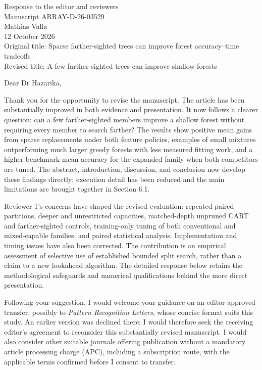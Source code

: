 \documentclass[11pt]{article}
\begin{document}
\begin{center}
{\Large Response to the editor and reviewers}\\[6pt]
Manuscript ARRAY-D-26-03529\\
Mathias Valla\\
12 October 2026\\
Original title: Sparse farther-sighted trees can improve forest accuracy--time tradeoffs\\
Revised title: A few farther-sighted trees can improve shallow forests
\end{center}

Dear Dr Hazarika,

Thank you for the opportunity to revise the manuscript. The article has been substantially improved in both evidence and presentation. It now follows a clearer question: can a few farther-sighted members improve a shallow forest without requiring every member to search farther? The results show positive mean gains from sparse replacements under both feature policies, examples of small mixtures outperforming much larger greedy forests with less measured fitting work, and a higher benchmark-mean accuracy for the expanded family when both competitors are tuned. The abstract, introduction, discussion, and conclusion now develop these findings directly; execution detail has been reduced and the main limitations are brought together in Section 6.1.

Reviewer 1's concerns have shaped the revised evaluation: repeated paired partitions, deeper and unrestricted capacities, matched-depth unpruned CART and farther-sighted controls, training-only tuning of both conventional and mixed-capable families, and paired statistical analysis. Implementation and timing issues have also been corrected. The contribution is an empirical assessment of selective use of established bounded split search, rather than a claim to a new lookahead algorithm. The detailed response below retains the methodological safeguards and numerical qualifications behind the more direct presentation.

Following your suggestion, I would welcome your guidance on an editor-approved transfer, possibly to \emph{Pattern Recognition Letters}, whose concise format suits this study. An earlier version was declined there; I would therefore seek the receiving editor's agreement to reconsider this substantially revised manuscript. I would also consider other suitable journals offering publication without a mandatory article processing charge (APC), including a subscription route, with the applicable terms confirmed before I consent to transfer.
\end{document}

